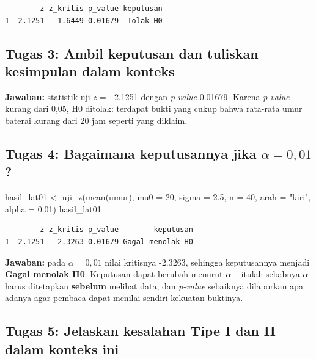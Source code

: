 \documentclass[
  indonesian,
  letterpaper,
]{book}
\newenvironment{Shaded}{\begin{snugshade}}{\end{snugshade}}
\newcommand{\AttributeTok}[1]{\textcolor[rgb]{0.40,0.45,0.13}{#1}}
\newcommand{\DecValTok}[1]{\textcolor[rgb]{0.68,0.00,0.00}{#1}}
\newcommand{\FloatTok}[1]{\textcolor[rgb]{0.68,0.00,0.00}{#1}}
\newcommand{\FunctionTok}[1]{\textcolor[rgb]{0.28,0.35,0.67}{#1}}
\newcommand{\NormalTok}[1]{\textcolor[rgb]{0.00,0.23,0.31}{#1}}
\newcommand{\OtherTok}[1]{\textcolor[rgb]{0.00,0.23,0.31}{#1}}
\newcommand{\StringTok}[1]{\textcolor[rgb]{0.13,0.47,0.30}{#1}}
\begin{document}
\begin{verbatim}
        z z_kritis p_value keputusan
1 -2.1251  -1.6449 0.01679  Tolak H0
\end{verbatim}

\subsection{Tugas 3: Ambil keputusan dan tuliskan kesimpulan dalam
konteks}\label{tugas-3-ambil-keputusan-dan-tuliskan-kesimpulan-dalam-konteks}

\textbf{Jawaban:} statistik uji \(z =\) -2.1251 dengan \emph{p-value}
0.01679. Karena \emph{p-value} kurang dari 0,05, H0 ditolak: terdapat
bukti yang cukup bahwa rata-rata umur baterai kurang dari 20 jam seperti
yang diklaim.

\subsection{\texorpdfstring{Tugas 4: Bagaimana keputusannya jika
\(\alpha = 0{,}01\)?}{Tugas 4: Bagaimana keputusannya jika \textbackslash alpha = 0\{,\}01?}}\label{tugas-4-bagaimana-keputusannya-jika-alpha-001}

\begin{Shaded}
\begin{Highlighting}[]
\NormalTok{hasil\_lat01 }\OtherTok{\textless{}{-}} \FunctionTok{uji\_z}\NormalTok{(}\FunctionTok{mean}\NormalTok{(umur), }\AttributeTok{mu0 =} \DecValTok{20}\NormalTok{, }\AttributeTok{sigma =} \FloatTok{2.5}\NormalTok{, }\AttributeTok{n =} \DecValTok{40}\NormalTok{, }\AttributeTok{arah =} \StringTok{"kiri"}\NormalTok{, }\AttributeTok{alpha =} \FloatTok{0.01}\NormalTok{)}
\NormalTok{hasil\_lat01}
\end{Highlighting}
\end{Shaded}

\begin{verbatim}
        z z_kritis p_value        keputusan
1 -2.1251  -2.3263 0.01679 Gagal menolak H0
\end{verbatim}

\textbf{Jawaban:} pada \(\alpha = 0{,}01\) nilai kritisnya -2.3263,
sehingga keputusannya menjadi \textbf{Gagal menolak H0}. Keputusan dapat
berubah menurut \(\alpha\) -- itulah sebabnya \(\alpha\) harus
ditetapkan \textbf{sebelum} melihat data, dan \emph{p-value} sebaiknya
dilaporkan apa adanya agar pembaca dapat menilai sendiri kekuatan
buktinya.

\subsection{Tugas 5: Jelaskan kesalahan Tipe I dan II dalam konteks
ini}\label{tugas-5-jelaskan-kesalahan-tipe-i-dan-ii-dalam-konteks-ini}
\end{document}
